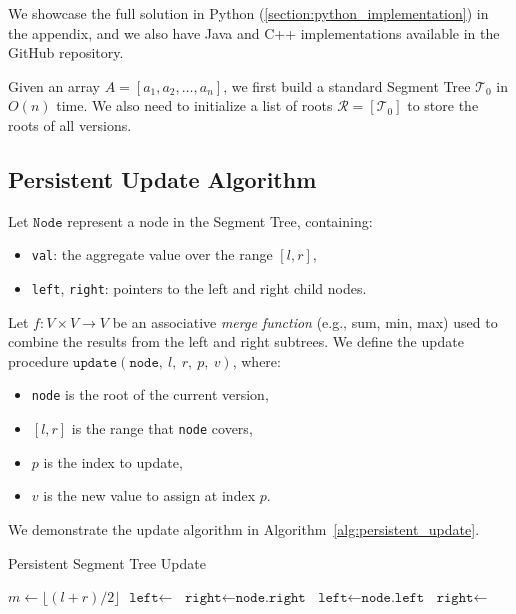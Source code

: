 \documentclass{fairmeta}
\numberwithin{equation}{section}
\begin{document}
We showcase the full solution in Python (\ref{section:python_implementation}) in the appendix, and we also have Java and C++ implementations available in the GitHub repository.

Given an array $A = [a_1, a_2, \dots, a_n]$, we first build a standard Segment Tree $\mathcal{T}_0$ in $O(n)$ time. We also need to initialize a list of roots $\mathcal{R} = [\mathcal{T}_0]$ to store the roots of all versions.

\subsection*{Persistent Update Algorithm}

Let $\texttt{Node}$ represent a node in the Segment Tree, containing:
\begin{itemize}
    \item \texttt{val}: the aggregate value over the range $[l, r]$,
    \item \texttt{left}, \texttt{right}: pointers to the left and right child nodes.
\end{itemize}
Let $f : V \times V \to V$ be an associative \emph{merge function} (e.g., sum, min, max) used to combine the results from the left and right subtrees.
We define the update procedure $\texttt{update}(\texttt{node},\ l,\ r,\ p,\ v)$, where:
\begin{itemize}
    \item \texttt{node} is the root of the current version,
    \item $[l, r]$ is the range that \texttt{node} covers,
    \item $p$ is the index to update,
    \item $v$ is the new value to assign at index $p$.
\end{itemize}
We demonstrate the update algorithm in Algorithm~\ref{alg:persistent_update}.

\begin{algorithm}[H]
    \caption{Persistent Segment Tree Update}
    \begin{algorithmic}[1]
        \State \Return {}
        \EndIf
        \State $m \gets \lfloor (l + r) / 2 \rfloor$
        \State $\texttt{left} \gets$ 
        \State $\texttt{right} \gets \texttt{node.right}$
        \Else
        \State $\texttt{left} \gets \texttt{node.left}$
        \State $\texttt{right} \gets$ 
        \EndIf
        \State \Return {}
        \EndFunction
    \end{algorithmic}
    \label{alg:persistent_update}
\end{algorithm}
\end{document}

